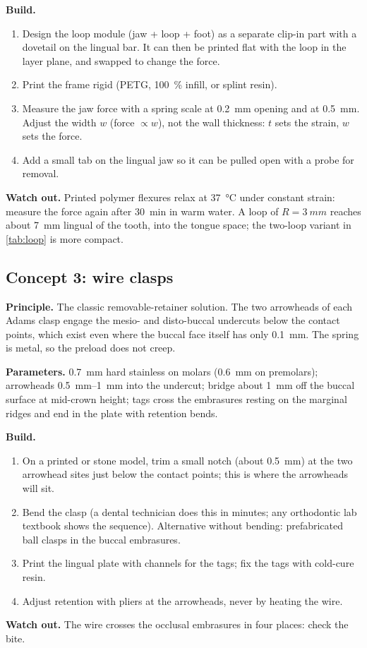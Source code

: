 \textbf{Build.}
\begin{enumerate}
\item Design the loop module (jaw + loop + foot) as a separate clip-in part with a dovetail on the
lingual bar. It can then be printed flat with the loop in the layer plane, and swapped to change
the force.
\item Print the frame rigid (PETG, \SI{100}{\percent} infill, or splint resin).
\item Measure the jaw force with a spring scale at \SI{0.2}{mm} opening and at \SI{0.5}{mm}. Adjust
the width $w$ (force $\propto w$), not the wall thickness: $t$ sets the strain, $w$ sets the force.
\item Add a small tab on the lingual jaw so it can be pulled open with a probe for removal.
\end{enumerate}
\textbf{Watch out.} Printed polymer flexures relax at \SI{37}{\celsius} under constant strain:
measure the force again after \SI{30}{min} in warm water. A loop of $R=\SI{3}{mm}$ reaches about
\SI{7}{mm} lingual of the tooth, into the tongue space; the two-loop variant in \cref{tab:loop}
is more compact.

\subsection{Concept 3: wire clasps}
\textbf{Principle.} The classic removable-retainer solution. The two arrowheads of each Adams
clasp engage the mesio- and disto-buccal undercuts below the contact points, which exist even where
the buccal face itself has only \SI{0.1}{mm}. The spring is metal, so the preload does not creep.

\textbf{Parameters.} \SI{0.7}{mm} hard stainless on molars (\SI{0.6}{mm} on premolars); arrowheads
\SIrange{0.5}{1}{mm} into the undercut; bridge about \SI{1}{mm} off the buccal surface at mid-crown
height; tags cross the embrasures resting on the marginal ridges and end in the plate with
retention bends.

\textbf{Build.}
\begin{enumerate}
\item On a printed or stone model, trim a small notch (about \SI{0.5}{mm}) at the two arrowhead
sites just below the contact points; this is where the arrowheads will sit.
\item Bend the clasp (a dental technician does this in minutes; any orthodontic lab textbook
shows the sequence). Alternative without bending: prefabricated ball clasps in the buccal
embrasures.
\item Print the lingual plate with channels for the tags; fix the tags with cold-cure resin.
\item Adjust retention with pliers at the arrowheads, never by heating the wire.
\end{enumerate}
\textbf{Watch out.} The wire crosses the occlusal embrasures in four places: check the bite.

